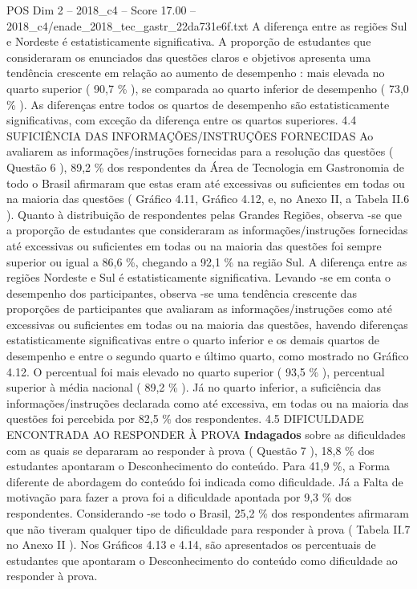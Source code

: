 \begin{textsample}{POS Dim 2 – 2018\_c4 – Score 17.00 – 2018\_c4/enade\_2018\_tec\_gastr\_22da731e6f.txt}
A diferença entre as regiões Sul e Nordeste é estatisticamente significativa.
A proporção de estudantes que consideraram os enunciados das questões claros e objetivos apresenta uma tendência crescente em relação ao aumento de desempenho : mais elevada no quarto superior ( 90,7 \% ), se comparada ao quarto inferior de desempenho ( 73,0 \% ).
As diferenças entre todos os quartos de desempenho são estatisticamente significativas, com exceção da diferença entre os quartos superiores. 4.4 SUFICIÊNCIA DAS INFORMAÇÕES/INSTRUÇÕES FORNECIDAS Ao avaliarem as informações/instruções fornecidas para a resolução das questões ( Questão 6 ), 89,2 \% dos respondentes da Área de Tecnologia em Gastronomia de todo o Brasil afirmaram que estas eram até excessivas ou suficientes em todas ou na maioria das questões ( Gráfico 4.11, Gráfico 4.12, e, no Anexo II, a Tabela II.6 ).
Quanto à distribuição de respondentes pelas Grandes Regiões, observa -se que a proporção de estudantes que consideraram as informações/instruções fornecidas até excessivas ou suficientes em todas ou na maioria das questões foi sempre superior ou igual a 86,6 \%, chegando a 92,1 \% na região Sul.
A diferença entre as regiões Nordeste e Sul é estatisticamente significativa.
Levando -se em conta o desempenho dos participantes, observa -se uma tendência crescente das proporções de participantes que avaliaram as informações/instruções como até excessivas ou suficientes em todas ou na maioria das questões, havendo diferenças estatisticamente significativas entre o quarto inferior e os demais quartos de desempenho e entre o segundo quarto e último quarto, como mostrado no Gráfico 4.12.
O percentual foi mais elevado no quarto superior ( 93,5 \% ), percentual superior à média nacional ( 89,2 \% ).
Já no quarto inferior, a suficiência das informações/instruções declarada como até excessiva, em todas ou na maioria das questões foi percebida por 82,5 \% dos respondentes. 4.5 DIFICULDADE ENCONTRADA AO RESPONDER À PROVA \textbf{Indagados} sobre as dificuldades com as quais se depararam ao responder à prova ( Questão 7 ), 18,8 \% dos estudantes apontaram o Desconhecimento do conteúdo.
Para 41,9 \%, a Forma diferente de abordagem do conteúdo foi indicada como dificuldade.
Já a Falta de motivação para fazer a prova foi a dificuldade apontada por 9,3 \% dos respondentes.
Considerando -se todo o Brasil, 25,2 \% dos respondentes afirmaram que não tiveram qualquer tipo de dificuldade para responder à prova ( Tabela II.7 no Anexo II ).
Nos Gráficos 4.13 e 4.14, são apresentados os percentuais de estudantes que apontaram o Desconhecimento do conteúdo como dificuldade ao responder à prova.

\end{textsample}
